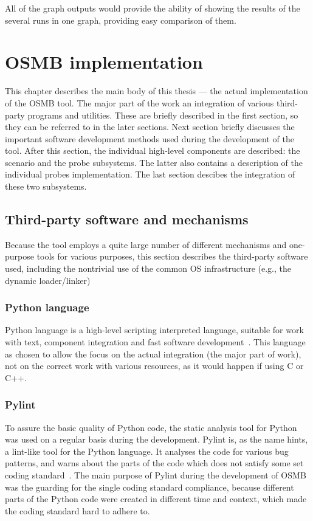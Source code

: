 All of the graph outputs would provide the ability of showing the results of the
several runs in one graph, providing easy comparison of them.

\chapter{OSMB implementation}

This chapter describes the main body of this thesis --- the actual implementation of the OSMB tool. The major part of the work an integration of various third-party programs and utilities. These are briefly described in the first section, so they can be referred to in the later sections. Next section briefly discusses the important software development methods used during the development of the tool. After this section, the individual high-level components are described: the scenario and the probe subsystems. The latter also contains a description of the individual probes implementation. The last section descibes the integration of these two subsystems.

\section{Third-party software and mechanisms}
Because the tool employs a quite large number of different mechanisms and one-purpose tools for various purposes, this section describes the third-party software used, including the nontrivial use of the common OS infrastructure (e.g., the dynamic loader/linker)

\subsection{Python language}
Python language is a high-level scripting interpreted language, suitable for work with text, component integration and fast software development~\cite{python}. This language as chosen to allow the focus on the actual integration (the major part of work), not on the correct work with various resources, as it would happen if using C or C++.

\subsection{Pylint}
To assure the basic quality of Python code, the static analysis tool for Python was used on a regular basis during the development. Pylint is, as the name hints, a lint-like tool for the Python language. It analyses the code for various bug patterns, and warns about the parts of the code which does not satisfy some set coding standard~\cite{pylint}. The main purpose of Pylint during the development of OSMB was the guarding for the single coding standard compliance, because different parts of the Python code were created in different time and context, which made the coding standard hard to adhere to.

